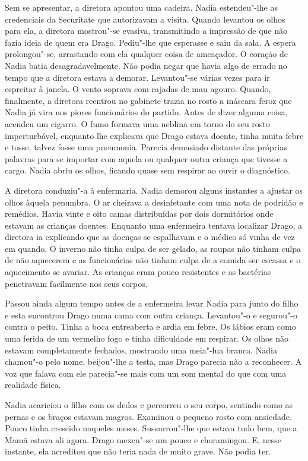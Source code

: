 Sem se apresentar, a diretora apontou uma cadeira. Nadia estendeu"-lhe
as credenciais da Securitate que autorizavam a visita. Quando levantou
os olhos para ela, a diretora mostrou"-se evasiva, transmitindo a
impressão de que não fazia ideia de quem era Drago. Pediu"-lhe que esperasse e saiu da sala. A espera prolongou"-se, arrastando com ela qualquer
coisa de ameaçador. O coração de Nadia batia desagradavelmente. Não
podia negar que havia algo de errado no tempo que a diretora estava a
demorar. Levantou"-se várias vezes para ir espreitar à janela. O vento
soprava com rajadas de mau agouro. Quando, finalmente, a diretora
reentrou no gabinete trazia no rosto a máscara feroz que Nadia já vira
nos piores funcionários do partido. Antes de dizer alguma coisa, acendeu
um cigarro. O fumo formava uma neblina em torno do seu rosto
imperturbável, enquanto lhe explicava que Drago estava doente, tinha
muita febre e tosse, talvez fosse uma pneumonia. Parecia demasiado
distante das próprias palavras para se importar com aquela ou qualquer
outra criança que tivesse a cargo. Nadia abriu os olhos, ficando quase
sem respirar ao ouvir o diagnóstico.

A diretora conduziu"-a à enfermaria. Nadia demorou
alguns instantes a ajustar os olhos àquela penumbra. O ar cheirava a
desinfetante com uma nota de podridão e remédios. Havia vinte e oito
camas distribuídas por dois dormitórios onde estavam as crianças
doentes. Enquanto uma enfermeira tentava localizar Drago, a diretora ia
explicando que as doenças se espalhavam e o médico só vinha de vez em
quando. O inverno não tinha culpa de ser gelado, as roupas não tinham
culpa de não aquecerem e as funcionárias não tinham culpa de a comida
ser escassa e o aquecimento se avariar. As crianças eram pouco
resistentes e as bactérias penetravam facilmente nos seus corpos.

Passou ainda algum tempo antes de a enfermeira levar Nadia para junto do
filho e esta encontrou Drago numa
cama com outra criança. Levantou"-o e segurou"-o contra o peito. Tinha a
boca entreaberta e ardia em febre. Os lábios eram como uma ferida de um
vermelho fogo e tinha dificuldade em respirar. Os olhos não estavam
completamente fechados, mostrando uma meia"-lua branca. Nadia chamou"-o
pelo nome, beijou"-lhe a testa, mas Drago parecia não a reconhecer. A voz
que falava com ele parecia"-se mais com um som mental do que com uma
realidade física.

Nadia acariciou o filho com os dedos e percorreu o seu corpo, sentindo
como as pernas e os braços estavam magros. Examinou o pequeno rosto com
ansiedade. Pouco tinha crescido naqueles meses. Sussurrou"-lhe que estava
tudo bem, que a Mamã estava ali agora. Drago mexeu"-se um pouco e %
choramingou. E, nesse instante, ela acreditou que não teria nada de
muito grave. Não podia ter.

